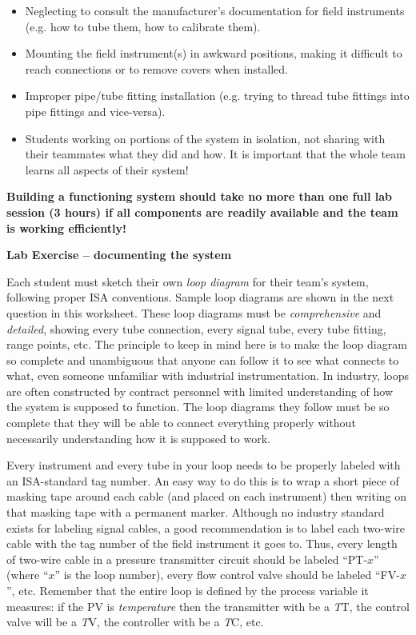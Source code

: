 \begin{itemize}
\item{} Neglecting to consult the manufacturer's documentation for field instruments (e.g. how to tube them, how to calibrate them).
\item{} Mounting the field instrument(s) in awkward positions, making it difficult to reach connections or to remove covers when installed.
\item{} Improper pipe/tube fitting installation (e.g. trying to thread tube fittings into pipe fittings and vice-versa).
\item{} Students working on portions of the system in isolation, not sharing with their teammates what they did and how.  It is important that the whole team learns all aspects of their system!
\end{itemize}

\vskip 10pt

{\bf Building a functioning system should take no more than one full lab session (3 hours) if all components are readily available and the team is working efficiently!}





\vfil \eject

\noindent
{\bf Lab Exercise -- documenting the system}

\vskip 5pt

Each student must sketch their own {\it loop diagram} for their team's system, following proper ISA conventions.  Sample loop diagrams are shown in the next question in this worksheet.  These loop diagrams must be {\it comprehensive} and {\it detailed}, showing every tube connection, every signal tube, every tube fitting, range points, etc.  The principle to keep in mind here is to make the loop diagram so complete and unambiguous that anyone can follow it to see what connects to what, even someone unfamiliar with industrial instrumentation.  In industry, loops are often constructed by contract personnel with limited understanding of how the system is supposed to function.  The loop diagrams they follow must be so complete that they will be able to connect everything properly without necessarily understanding how it is supposed to work.

Every instrument and every tube in your loop needs to be properly labeled with an ISA-standard tag number.  An easy way to do this is to wrap a short piece of masking tape around each cable (and placed on each instrument) then writing on that masking tape with a permanent marker.  Although no industry standard exists for labeling signal cables, a good recommendation is to label each two-wire cable with the tag number of the field instrument it goes to.  Thus, every length of two-wire cable in a pressure transmitter circuit should be labeled ``PT-$x$'' (where ``$x$'' is the loop number), every flow control valve should be labeled ``FV-$x$'', etc.  Remember that the entire loop is defined by the process variable it measures: if the PV is {\it temperature} then the transmitter with be a {\it T}T, the control valve will be a {\it T}V, the controller with be a {\it T}C, etc.

